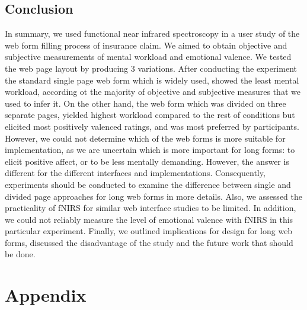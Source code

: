 \documentclass[a4paper]{report}
\begin{document}
	\section{Conclusion}
		In summary, we used functional near infrared spectroscopy in a user study of the web form filling process of insurance claim. We aimed to obtain objective and subjective measurements of mental workload and emotional valence. We tested the web page layout by producing 3 variations. After conducting the experiment the standard single page web form which is widely used, showed the least mental workload, according ot the majority of objective and subjective measures that we used to infer it. On the other hand, the web form which was divided on three separate pages, yielded highest workload compared to the rest of conditions but elicited most positively valenced ratings, and was most preferred by participants. However, we could not determine which of the web forms is more suitable for implementation, as we are uncertain which is more important for long forms: to elicit positive affect, or to be less mentally demanding. However, the answer is different for the different interfaces and implementations. Consequently, experiments should be conducted to examine the difference between single and divided page approaches for long web forms in more details. Also, we assessed the practicality of fNIRS for similar web interface studies to be limited. In addition, we could not reliably measure the level of emotional valence with fNIRS in this particular experiment. Finally, we outlined implications for design for long web forms, discussed the disadvantage of the study and the future work that should be done.
	
	
\chapter*{Appendix}
\end{document}
